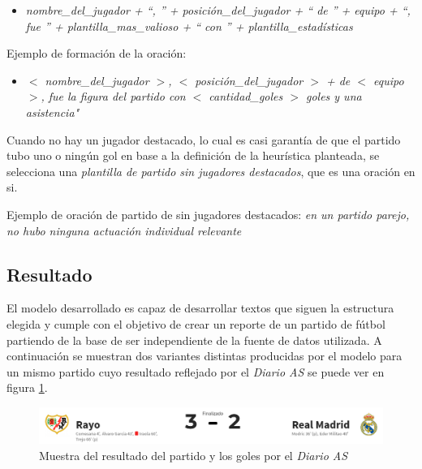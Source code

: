     \begin{itemize}
        \item \textit{nombre\_del\_jugador + “, ” + posición\_del\_jugador + “ de ” + equipo + “, fue ” + plantilla\_mas\_valioso + “ con ” +  plantilla\_estadísticas}
    \end{itemize}

    Ejemplo de formación de la oración:

    \begin{itemize}
        \item \textit{$<$ nombre\_del\_jugador $>$, $<$ posición\_del\_jugador $>$ + de $<$ equipo $>$, fue la figura del partido con $<$ cantidad\_goles $>$ goles y una asistencia" }
    \end{itemize}

    Cuando no hay un jugador destacado, lo cual es casi garantía de que el partido tubo uno o ningún gol en base a la definición de la heurística planteada, se selecciona una 
    \textit{plantilla de partido sin jugadores destacados}, que es una oración en si.

    Ejemplo de oración de partido de sin jugadores destacados: \textit{en un partido parejo, no hubo ninguna actuación individual relevante}


\subsection{Resultado}

    El modelo desarrollado es capaz de desarrollar textos que siguen la estructura elegida y cumple con el objetivo de 
crear un reporte de un partido de fútbol partiendo de la base de ser independiente de la fuente de datos utilizada. 
A continuación se muestran  dos variantes distintas producidas por el modelo para un mismo partido cuyo resultado reflejado por el 
\textit{Diario AS} se puede ver en figura \ref{fig_rayomadrid}.
\\

\begin{figure}[!]
    \begin{center}
        \includegraphics[scale=0.4]{Graphics/rayomadrid.png}
    \end{center}
    \caption{Muestra del resultado del partido y los goles por el \textit{Diario AS}}
    \label{fig_rayomadrid}
\end{figure}

